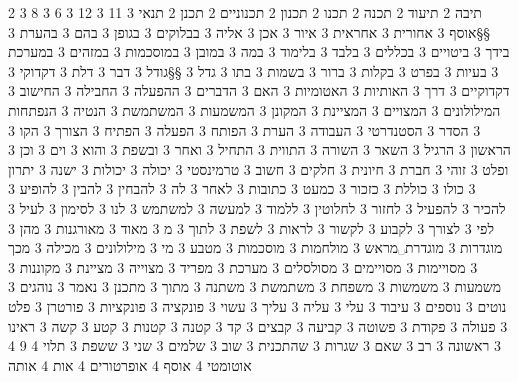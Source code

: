       2 תיבה
      2 תיעוד
      2 תכנה
      2 תכנו
      2 תכנון
      2 תכנוניים
      2 תכנן
      2 תנאי
      3 11
      3 12
      3 6
      3 8
      3 §§אוסף
      3 אחורית
      3 אחראית
      3 איור
      3 אכן
      3 אליה
      3 בבלוקים
      3 בגופן
      3 בהם
      3 בהערת
      3 בידך
      3 ביטויים
      3 בכללים
      3 בלבד
      3 בלימוד
      3 במה
      3 במובן
      3 במוסכמות
      3 במזהים
      3 במערכת
      3 בעיות
      3 בפרט
      3 בקלות
      3 ברור
      3 בשמות
      3 בתו
      3 גדל
      3 §§גודל
      3 דבר
      3 דלת
      3 דקדוקי
      3 דקדוקיים
      3 דרך
      3 האותיות
      3 האטומיות
      3 האם
      3 הדברים
      3 ההפעלה
      3 החבילה
      3 החישוב
      3 המילולונים
      3 המצויים
      3 המציינת
      3 המקונן
      3 המשמעות
      3 המשתמשת
      3 הנטיה
      3 הנפתחות
      3 הסדר
      3 הסטנדרטי
      3 העבודה
      3 הערת
      3 הפותח
      3 הפעלה
      3 הפתיח
      3 הצורך
      3 הקו
      3 הראשון
      3 הרגיל
      3 השאר
      3 השורה
      3 התווית
      3 התחיל
      3 ואחר
      3 ובשפת
      3 והוא
      3 וים
      3 וכן
      3 ופלט
      3 זוהי
      3 חברת
      3 חיונית
      3 חלקים
      3 חשוב
      3 טרמינסטי
      3 יכולה
      3 יכולות
      3 ישנה
      3 יתרון
      3 כולו
      3 כוללת
      3 כזכור
      3 כמעט
      3 כתובות
      3 לאחר
      3 לה
      3 להבחין
      3 להבין
      3 להופיע
      3 להכיר
      3 להפעיל
      3 לחזור
      3 לחלוטין
      3 ללמוד
      3 למעשה
      3 למשתמש
      3 לנו
      3 לסימון
      3 לעיל
      3 לפי
      3 לצורך
      3 לקבוע
      3 לקשור
      3 לראות
      3 לשפת
      3 לתוך
      3 מ
      3 מאוד
      3 מאורגנות
      3 מהן
      3 מוגדרות
      3 מוגדרת␣מראש
      3 מולחמות
      3 מוסכמות
      3 מטבע
      3 מי
      3 מילולונים
      3 מכילה
      3 מכך
      3 מסויימות
      3 מסויימים
      3 מסולסלים
      3 מערכת
      3 מפריד
      3 מצוייה
      3 מציינת
      3 מקוננות
      3 משמעות
      3 משמשות
      3 משפחת
      3 משתמשת
      3 משתנה
      3 מתוך
      3 מתכנן
      3 נאמר
      3 נוהגים
      3 נוטים
      3 נוספים
      3 עיבוד
      3 עלי
      3 עליה
      3 עליך
      3 עשוי
      3 פונקציה
      3 פונקציות
      3 פורטרן
      3 פלט
      3 פעולה
      3 פקודת
      3 פשוטה
      3 קביעה
      3 קבצים
      3 קד
      3 קטנה
      3 קטנות
      3 קטע
      3 קשה
      3 ראינו
      3 ראשונה
      3 רב
      3 שאם
      3 שגרות
      3 שהתכנית
      3 שוב
      3 שלמים
      3 שני
      3 ששפת
      3 תלוי
      4 9
      4 אוטומטי
      4 אוסף
      4 אופרטורים
      4 אות
      4 אותה
